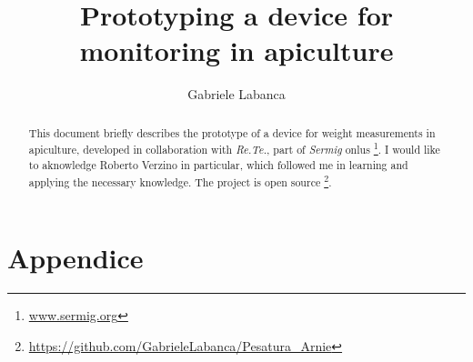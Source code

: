 \documentclass{article}
\title{Prototyping a device for monitoring in  apiculture}
\author{Gabriele Labanca}
\begin{document}
\maketitle

\begin{abstract}
This document briefly describes the prototype of a device for weight measurements in apiculture, developed in collaboration with \textit{Re.Te.}, part of \textit{Sermig} onlus \footnote{\url{www.sermig.org}}. I would like to aknowledge Roberto Verzino in particular, which followed me in learning and applying the necessary knowledge. The project is open source \footnote{\url{https://github.com/GabrieleLabanca/Pesatura_Arnie}}.
\end{abstract}

\newpage
\tableofcontents






\section{Appendice}



\end{document}

